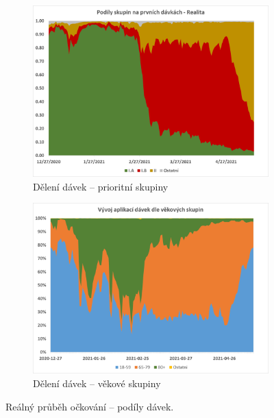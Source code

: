 \begin{figure}
\centering

\begin{subfigure}{0.9\textwidth}
\includegraphics[width=\textwidth]{assets/theta_real}
\caption{Dělení dávek -- prioritní skupiny}
\label{gr_real_theta}
\end{subfigure}

\begin{subfigure}{0.9\textwidth}
\includegraphics[width=\textwidth]{assets/chart_vek}
\caption{Dělení dávek -- věkové skupiny}
\label{gr_skupiny_davky_vek}
\end{subfigure}


\caption{Reálný průběh očkování -- podíly dávek.}
\end{figure}

